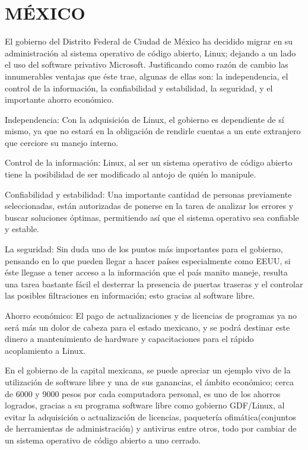 \section*{MÉXICO}
El gobierno del Distrito Federal de Ciudad de México ha decidido migrar en su administración al sistema operativo de código abierto, Linux; dejando a un lado el uso del software 
privativo Microsoft. Justificando como razón de cambio las innumerables ventajas que éste trae, algunas de ellas son: la independencia, el control de la información, la 
confiabilidad y estabilidad, la seguridad, y el importante ahorro económico.

Independencia: Con la adquisición de Linux, el gobierno es dependiente de sí mismo, ya que no estará en la obligación de rendirle cuentas a un ente extranjero que cerciore su 
manejo interno.

Control de la información: Linux, al ser un sistema operativo de código abierto tiene la posibilidad de ser modificado al antojo de quién lo manipule.

Confiabilidad y estabilidad: Una importante cantidad de personas previamente seleccionadas, están autorizadas de ponerse en la tarea de analizar los errores y buscar soluciones 
óptimas, permitiendo así que el sistema operativo sea confiable y estable.

La seguridad: Sin duda uno de los puntos más importantes para el gobierno, pensando en lo que pueden llegar a hacer países especialmente como EEUU, si éste llegase a tener acceso 
a la información que el país manito maneje, resulta una tarea bastante fácil el desterrar la presencia de puertas traseras y el controlar las posibles filtraciones en 
información; esto gracias al software libre.

Ahorro económico: El pago de actualizaciones y de licencias de programas ya no será más un dolor de cabeza para el estado mexicano, y se podrá destinar este dinero a 
mantenimiento de hardware y capacitaciones para el rápido acoplamiento a Linux.

En el gobierno de la capital mexicana, se puede apreciar un ejemplo vivo de la utilización de software libre y una de sus ganancias, el ámbito económico; cerca de 6000 y 9000 
pesos por cada computadora personal, es uno de los ahorros logrados, gracias a su programa software libre como gobierno GDF/Linux, al evitar la adquisición o actualización de 
licencias, paquetería ofimática(conjuntos de herramientas de administración) y antivirus entre otros, todo por cambiar de un sistema operativo de código abierto a uno cerrado.

